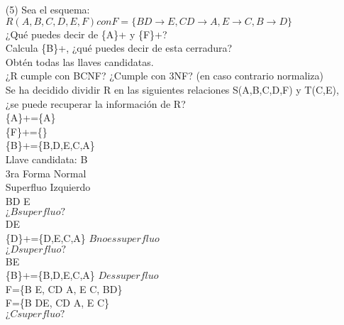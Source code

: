 \documentclass{article}
\begin{document}
\begin{enumerate}
$Superfluo Derecho:$\\
A\rightarrow BC\\
$¿B superfluo?$\\
F'=\{A \rightarrow C, B \rightarrow D, D\rightarrow E, E\rightarrow A\}\\
\{A\}+=\{A,C\} $B no es superfluo$\\
$C superfluo$\\
F'=\{A \rightarrow B, B \rightarrow D, D\rightarrow E, E \rightarrow A\}\\
\{A\}+=\{A,B,D,E\} $C no es superfluo$\\
$F ya tiene el minimo conjunto de dependencias funcionales al terminar de ver los superfluos izquierdos$\\
\item[(5)] Sea el esquema:\\
$R(A,B,C,D,E,F) con F=\{BD \rightarrow E, CD \rightarrow A, E \rightarrow C, B \rightarrow D\}$\\
¿Qué puedes decir de \{A\}+ y \{F\}+?\\
Calcula \{B\}+, ¿qué puedes decir de esta cerradura?\\
Obtén todas las llaves candidatas.\\
¿R cumple con BCNF? ¿Cumple con 3NF? (en caso contrario normaliza)\\
Se ha decidido dividir R en las siguientes relaciones S(A,B,C,D,F) y T(C,E), ¿se puede recuperar la
información de R?\\
\{A\}+=\{A\}\\
\{F\}+=\{\}\\
\{B\}+=\{B,D,E,C,A\}\\
Llave candidata: B\\
3ra Forma Normal\\
Superfluo Izquierdo\\
BD \rightarrow E\\
$¿B superfluo?$\\
D\rightarrow E\\
\{D\}+=\{D,E,C,A\} $B no es superfluo$\\
$¿D superfluo?$\\
B\rightarrow E\\
\{B\}+=\{B,D,E,C,A\} $D es superfluo$\\
F=\{B \rightarrow E, CD \rightarrow A, E \rightarrow C, B\rightarrow D\}\\
F=\{B \rightarrow DE, CD \rightarrow A, E \rightarrow C\}\\
$¿C superfluo?$\\

\end{enumerate}
\end{document}
